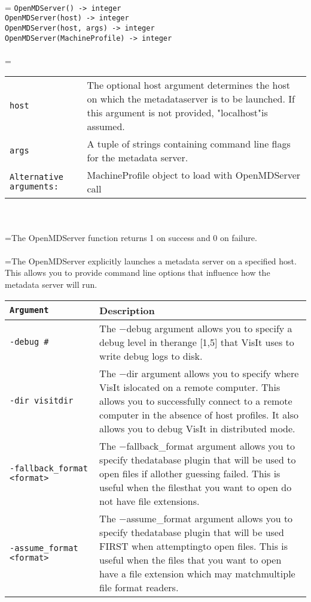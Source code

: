 \documentclass[10pt,a4paper]{report}
\begin{document}
 \\ 
\hangindent=\parindent 
\verb!OpenMDServer() -> integer!\\ 
\verb!OpenMDServer(host) -> integer!\\ 
\verb!OpenMDServer(host, args) -> integer!\\ 
\verb!OpenMDServer(MachineProfile) -> integer!\\ [-3mm]

 \\ 
\hangindent=\parindent 
\begin{tabular}{lp{9cm}}
\verb!host! & The optional host argument determines the host on which the metadataserver is to be launched. If this argument is not provided, "localhost"is assumed. \\
\verb!args! & A tuple of strings containing command line flags for the metadata server. \\
\verb!Alternative arguments:! & MachineProfile object to load with OpenMDServer call \\
\end{tabular} \\[-2mm]


 \\ 
\hangindent=\parindent The OpenMDServer function returns 1 on success and 0 on failure. \\[-3mm] 

 \\ 
\hangindent=\parindent The OpenMDServer explicitly launches a metadata server on a specified host. This allows you to provide command line options that influence how the metadata server will run. \\

\begin{tabular}{|l|p{9cm}|}
\hline
\verb!Argument! & Description \\
\hline \hline
\verb!-debug #! & The $-$debug argument allows you to specify a debug level in therange [1,5] that VisIt uses to write debug logs to disk. \\
\verb!-dir visitdir! & The $-$dir argument allows you to specify where VisIt islocated on a remote computer. This allows you to successfully connect to a remote computer in the absence of host profiles. It also allows you to debug VisIt in distributed mode. \\
\verb!-fallback_format <format>! & The $-$fallback\_format argument allows you to specify thedatabase plugin that will be used to open files if allother guessing failed. This is useful when the filesthat you want to open do not have file extensions. \\
\verb!-assume_format <format>! & The $-$assume\_format argument allows you to specify thedatabase plugin that will be used FIRST when attemptingto open files. This is useful when the files that you want to open have a file extension which may matchmultiple file format readers. \\
\hline
\end{tabular} \\[-2mm]
\\[-3mm] 
\end{document}
